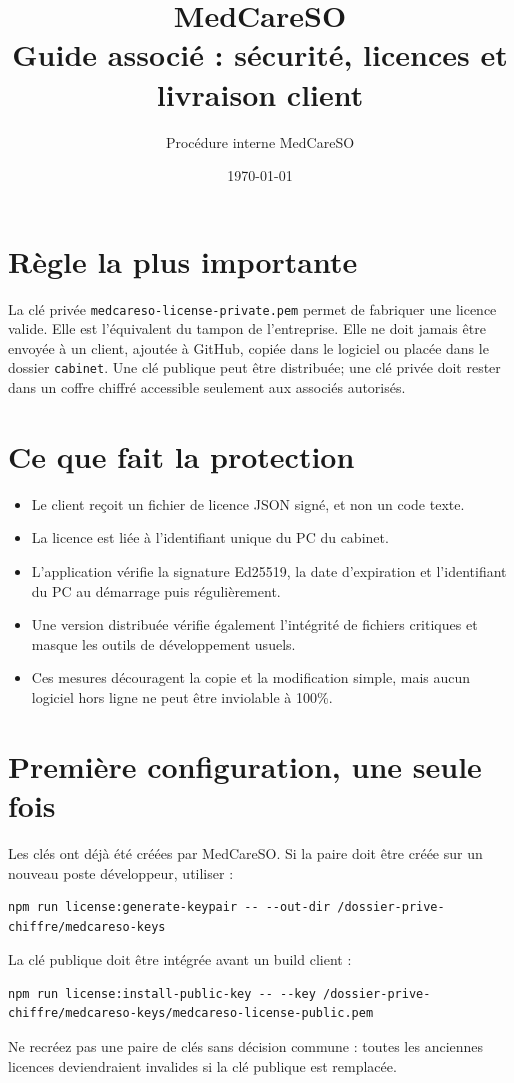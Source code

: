 \documentclass[11pt,a4paper]{article}
\title{MedCareSO\\Guide associé : sécurité, licences et livraison client}
\author{Procédure interne MedCareSO}
\date{\today}
\begin{document}
\maketitle

\section*{Règle la plus importante}
La clé privée \texttt{medcareso-license-private.pem} permet de fabriquer une
licence valide. Elle est l'équivalent du tampon de l'entreprise. Elle ne doit
jamais être envoyée à un client, ajoutée à GitHub, copiée dans le logiciel ou
placée dans le dossier \texttt{cabinet}. Une clé publique peut être distribuée;
une clé privée doit rester dans un coffre chiffré accessible seulement aux
associés autorisés.

\section{Ce que fait la protection}
\begin{itemize}
\item Le client reçoit un fichier de licence JSON signé, et non un code texte.
\item La licence est liée à l'identifiant unique du PC du cabinet.
\item L'application vérifie la signature Ed25519, la date d'expiration et
l'identifiant du PC au démarrage puis régulièrement.
\item Une version distribuée vérifie également l'intégrité de fichiers
critiques et masque les outils de développement usuels.
\item Ces mesures découragent la copie et la modification simple, mais aucun
logiciel hors ligne ne peut être inviolable à 100\%.
\end{itemize}

\section{Première configuration, une seule fois}
Les clés ont déjà été créées par MedCareSO. Si la paire doit être créée sur un
nouveau poste développeur, utiliser :
\begin{verbatim}
npm run license:generate-keypair -- --out-dir /dossier-prive-chiffre/medcareso-keys
\end{verbatim}
La clé publique doit être intégrée avant un build client :
\begin{verbatim}
npm run license:install-public-key -- --key /dossier-prive-chiffre/medcareso-keys/medcareso-license-public.pem
\end{verbatim}
Ne recréez pas une paire de clés sans décision commune : toutes les anciennes
licences deviendraient invalides si la clé publique est remplacée.
\end{document}
